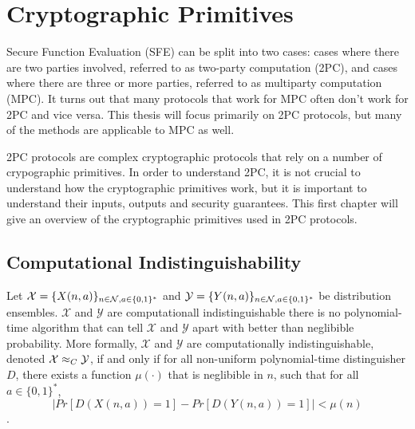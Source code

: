 \chapter{Cryptographic Primitives}
Secure Function Evaluation (SFE) can be split into two cases: cases where there are two parties involved, referred to as two-party computation (2PC), and cases where there are three or more parties, referred to as multiparty computation (MPC).
It turns out that many protocols that work for MPC often don't work for 2PC and vice versa.
This thesis will focus primarily on 2PC protocols, but many of the methods are applicable to MPC as well.

2PC protocols are complex cryptographic protocols that rely on a number of crypographic primitives.
In order to understand 2PC, it is not crucial to understand how the cryptographic primitives work, but it is important to understand their inputs, outputs and security guarantees. 
This first chapter will give an overview of the cryptographic primitives used in 2PC protocols.

\section{Computational Indistinguishability} 
\label{sctn:computational-indistinguishability}


Let $\mathcal{X} = \{X(n,a)\}_{n \in \mathcal{N}, a \in \{0,1\}^*}$ and $\mathcal{Y} = \{Y(n,a)\}_{n \in \mathcal{N}, a \in \{0,1\}^*}$ be distribution ensembles.
$\mathcal{X}$ and $\mathcal{Y}$ are computationall indistinguishable there is no polynomial-time algorithm that can tell $\mathcal{X}$ and $\mathcal{Y}$ apart with better than neglibible probability.
More formally, $\mathcal{X}$ and $\mathcal{Y}$ are computationally indistinguishable, denoted $\mathcal{X} \approx_C \mathcal{Y}$, if and only if for all non-uniform polynomial-time distinguisher $D$, there exists a function $\mu(\cdot)$ that is neglibible in $n$, such that for all $a \in \{0,1\}^*$, 
\begin{equation}
    |Pr[D(X(n,a)) = 1] - Pr[D(Y(n,a)) = 1]| < \mu(n)
\end{equation}
\cite{lindell2009secure}.

